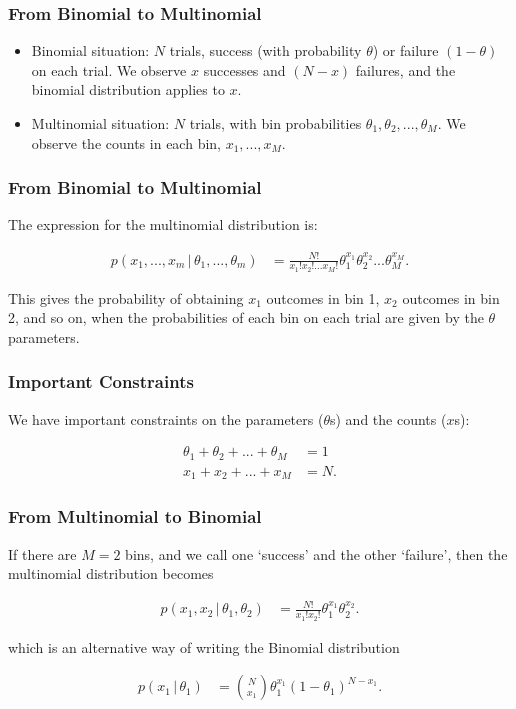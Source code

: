 \documentclass{beamer}
\newcommand{\given}{\,|\,}
\begin{document}
\begin{frame}
\frametitle{From Binomial to Multinomial}

\begin{itemize}
\item Binomial situation: $N$ trials, success (with probability $\theta$)
or failure $(1-\theta)$ on each trial. We observe $x$ successes and $(N-x)$
failures, and the binomial distribution applies to $x$.\pause
\item Multinomial situation: $N$ trials, with bin probabilities
$\theta_1, \theta_2, ..., \theta_M$. We observe the counts in each bin,
$x_1, ..., x_M$.
\end{itemize}

\end{frame}

\begin{frame}
\frametitle{From Binomial to Multinomial}
The expression for the multinomial distribution is:

\begin{align}
p(x_1, ..., x_m \given \theta_1, ..., \theta_m)
    &= \frac{N!}{x_1!x_2!...x_M!}\theta_1^{x_1}\theta_2^{x_2}...\theta_M^{x_M}.
\end{align}
\pause

This gives the probability of obtaining $x_1$ outcomes in bin 1,
$x_2$ outcomes in bin 2, and so on, when the probabilities
of each bin on each trial are given by the $\theta$ parameters.

\end{frame}


\begin{frame}
\frametitle{Important Constraints}
We have important constraints on the parameters ($\theta$s) and the counts
($x$s):

\begin{align}
\theta_1 + \theta_2 + ... + \theta_M &= 1 \\
x_1 + x_2 + ... + x_M &= N.
\end{align}

\end{frame}


\begin{frame}
\frametitle{From Multinomial to Binomial}
If there are $M=2$ bins, and we call one `success' and the other `failure',
then the multinomial distribution becomes

\begin{align}
p(x_1, x_2 \given \theta_1, \theta_2)
    &= \frac{N!}{x_1!x_2!}\theta_1^{x_1}\theta_2^{x_2}.
\end{align}

which is an alternative way of writing the Binomial distribution

\begin{align}
p(x_1 \given \theta_1)
    &= \binom{N}{x_1}\theta_1^{x_1}(1 - \theta_1)^{N - x_1}.
\end{align}


\end{frame}
\end{document}

